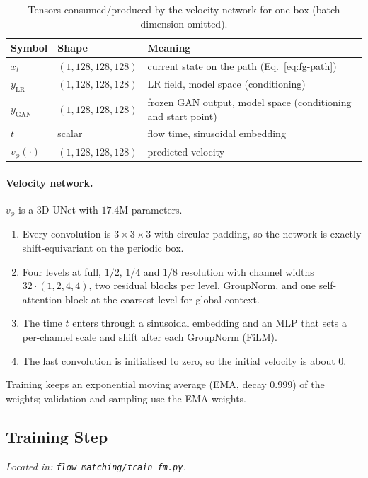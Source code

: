 \begin{table}[t]
\centering
\caption{Tensors consumed/produced by the velocity network for one box (batch
dimension omitted).}
\label{tab:fg-io}
\begin{tabular}{lll}
\toprule
Symbol & Shape & Meaning \\
\midrule
$x_t$ & $(1,128,128,128)$ & current state on the path (Eq.~\ref{eq:fg-path}) \\
$y_\text{LR}$ & $(1,128,128,128)$ & LR field, model space (conditioning) \\
$y_\text{GAN}$ & $(1,128,128,128)$ & frozen GAN output, model space (conditioning and start point) \\
$t$ & scalar & flow time, sinusoidal embedding \\
$v_\phi(\cdot)$ & $(1,128,128,128)$ & predicted velocity \\
\bottomrule
\end{tabular}
\end{table}

\paragraph{Velocity network.} $v_\phi$ is a 3D UNet with $17.4$M parameters.
\begin{enumerate}
  \item Every convolution is $3{\times}3{\times}3$ with circular padding, so the
  network is exactly shift-equivariant on the periodic box.
  \item Four levels at full, $1/2$, $1/4$ and $1/8$ resolution with channel
  widths $32\cdot(1,2,4,4)$, two residual blocks per level, GroupNorm, and one
  self-attention block at the coarsest level for global context.
  \item The time $t$ enters through a sinusoidal embedding and an MLP that sets a
  per-channel scale and shift after each GroupNorm (FiLM).
  \item The last convolution is initialised to zero, so the initial velocity is
  about $0$.
\end{enumerate}
Training keeps an exponential moving average (EMA, decay $0.999$) of the weights;
validation and sampling use the EMA weights.

\subsection{Training Step}
\textit{Located in: \texttt{flow\_matching/train\_fm.py}.}

